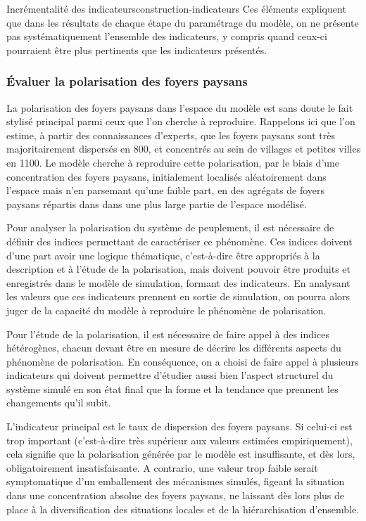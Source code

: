 \documentclass[12pt, a4paper, oneside]{book}
\begin{document}
\begin{encadre}{Incrémentalité des indicateurs}{construction-indicateurs}
		Ces éléments expliquent que dans les résultats de chaque étape du paramétrage du modèle, on ne présente pas systématiquement l'ensemble des indicateurs, y compris quand ceux-ci pourraient être plus pertinents que les indicateurs présentés.
	\end{encadre}
	
	
	\pagebreak
	\subsubsection{Évaluer la polarisation des foyers paysans \label{subsub:polarisation}}
	
	La polarisation des foyers paysans dans l'espace du modèle est sans doute le fait stylisé principal parmi ceux que l'on cherche à reproduire. Rappelons ici que l'on estime, à partir des connaissances d'experts, que les foyers paysans sont très majoritairement dispersés en 800, et concentrés au sein de villages et petites villes en 1100.
	Le modèle cherche à reproduire cette polarisation, par le biais d'une concentration des foyers paysans, initialement localisés aléatoirement dans l'espace mais n'en parsemant qu'une faible part, en des agrégats de foyers paysans répartis dans dans une plus large partie de l'espace modélisé.
	
	Pour analyser la polarisation du système de peuplement, il est nécessaire de définir des indices permettant de caractériser ce phénomène. Ces indices doivent d'une part avoir une logique thématique, c'est-à-dire être appropriés à la description et à l'étude de la polarisation, mais doivent  pouvoir être produits et enregistrés dans le modèle de simulation, formant des indicateurs.
	En analysant les valeurs que ces indicateurs prennent en sortie de simulation, on pourra alors juger de la capacité du modèle à reproduire le phénomène de polarisation.
	
	Pour l'étude de la polarisation, il est nécessaire de faire appel à des indices hétérogènes, chacun devant être en mesure de décrire les différents aspects du phénomène de polarisation. En conséquence, on a choisi de faire appel à plusieurs indicateurs qui doivent permettre d'étudier aussi bien l'aspect structurel du système simulé en son état final que la forme et la tendance que prennent les changements qu'il subit.
	
	L'indicateur principal est le taux de dispersion des foyers paysans. Si celui-ci est trop important (c'est-à-dire très supérieur aux valeurs estimées empiriquement), cela signifie que la polarisation générée par le modèle est insuffisante, et dès lors, obligatoirement insatisfaisante. A contrario, une valeur trop faible serait symptomatique d'un emballement des mécanismes simulés, figeant la situation dans une concentration absolue des foyers paysans, ne laissant dès lors plus de place à la diversification des situations locales et de la hiérarchisation d'ensemble.
	
\end{document}
